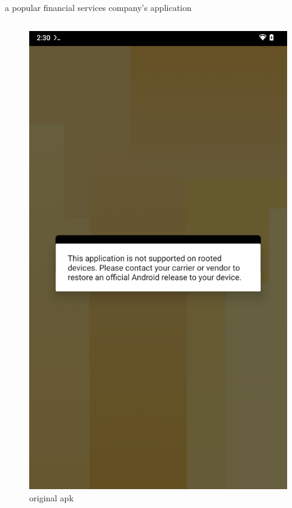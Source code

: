 \documentclass{beamer}
\begin{document}
\begin{frame}[fragile]{a popular financial services company's application}
    
    \begin{columns}
        \begin{figure}
            \centering
            \includegraphics[scale=0.07]{wu.png}
            \caption{original apk}
            \end{figure}

\end{columns}
\end{frame}
\end{document}
